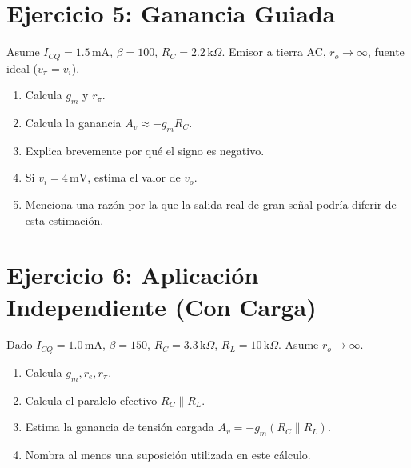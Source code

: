 \documentclass[11pt, a4paper]{article}
\begin{document}
\section*{Ejercicio 5: Ganancia Guiada}
Asume $I_{CQ}=1.5\,\text{mA}$, $\beta=100$, $R_C=2.2\,\text{k}\Omega$. Emisor a tierra AC, $r_o \to \infty$, fuente ideal ($v_\pi = v_i$).
\begin{enumerate}
    \item Calcula $g_m$ y $r_\pi$.
    \item Calcula la ganancia $A_v \approx -g_m R_C$.
    \item Explica brevemente por qué el signo es negativo.
    \item Si $v_i = 4\,\text{mV}$, estima el valor de $v_o$.
    \item Menciona una razón por la que la salida real de gran señal podría diferir de esta estimación.
\end{enumerate}

\section*{Ejercicio 6: Aplicación Independiente (Con Carga)}
Dado $I_{CQ}=1.0\,\text{mA}$, $\beta=150$, $R_C=3.3\,\text{k}\Omega$, $R_L=10\,\text{k}\Omega$. Asume $r_o \to \infty$.
\begin{enumerate}
    \item Calcula $g_m, r_e, r_\pi$.
    \item Calcula el paralelo efectivo $R_C \parallel R_L$.
    \item Estima la ganancia de tensión cargada $A_v = -g_m (R_C \parallel R_L)$.
    \item Nombra al menos una suposición utilizada en este cálculo.
\end{enumerate}
\end{document}

